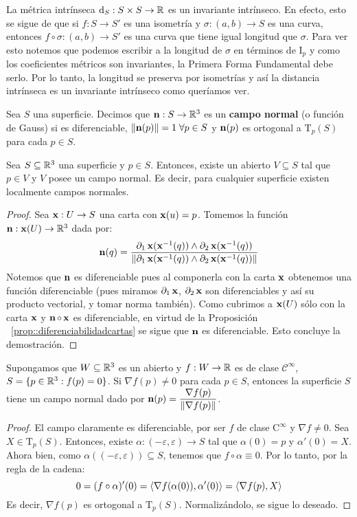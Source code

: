 \begin{obs}
La métrica intrínseca $\mathop{}\!\mathrm{d}_S:S\times S\to\mathbb{R}$ es un invariante intrínseco. En efecto, esto se sigue de que si $f:S\to S'$ es una isometría y $\sigma:(a,b)\to S$ es una curva, entonces $f\circ\sigma:(a,b)\to S'$ es una curva que tiene igual longitud que $\sigma$. Para ver esto notemos que podemos escribir a la longitud de $\sigma$ en términos de $\mathrm{I}_p$ y como los coeficientes métricos son invariantes, la Primera Forma Fundamental debe serlo. Por lo tanto, la longitud se preserva por isometrías y así la distancia intrínseca es un invariante intrínseco como queríamos ver.
\end{obs}

\begin{defn}
Sea $S$ una superficie. Decimos que $\operatorname{\mathbf{n}}:S\to\mathbb{R}^3$ es un \textbf{campo normal} (o función de Gauss) si es diferenciable, $\left\| \operatorname{\mathbf{n}}(p) \right\|=1\;\forall p\in S$ y $\operatorname{\mathbf{n}}(p)$ es ortogonal a $\mathrm{T}_p(S)$ para cada $p\in S$. 
\end{defn}

\begin{prop}
Sea $S\subseteq\mathbb{R}^3$ una superficie y $p\in S$. Entonces, existe un abierto $V\subseteq S$ tal que $p\in V$ y $V$ posee un campo normal. Es decir, para cualquier superficie existen localmente campos normales.
\begin{proof}
Sea $\operatorname{\mathbf{x}}:U\to S$ una carta con $\operatorname{\mathbf{x}}(u)=p$. Tomemos la función $\operatorname{\mathbf{n}}:\operatorname{\mathbf{x}}(U)\to\mathbb{R}^3$ dada por: $$\operatorname{\mathbf{n}}(q)=\dfrac{\partial_1\operatorname{\mathbf{x}}(\operatorname{\mathbf{x}}^{-1}(q))\wedge\partial_2\operatorname{\mathbf{x}}(\operatorname{\mathbf{x}}^{-1}(q))}{\left\| \partial_1\operatorname{\mathbf{x}}(\operatorname{\mathbf{x}}^{-1}(q))\wedge\partial_2\operatorname{\mathbf{x}}(\operatorname{\mathbf{x}}^{-1}(q)) \right\|}$$ Notemos que $\operatorname{\mathbf{n}}$ es diferenciable pues al componerla con la carta $\operatorname{\mathbf{x}}$ obtenemos una función diferenciable (pues miramos $\partial_1\operatorname{\mathbf{x}}$, $\partial_2\operatorname{\mathbf{x}}$ son diferenciables y así su producto vectorial, y tomar norma también). Como cubrimos a $\operatorname{\mathbf{x}}(U)$ sólo con la carta $\operatorname{\mathbf{x}}$ y $\operatorname{\mathbf{n}}\circ\operatorname{\mathbf{x}}$ es diferenciable, en virtud de la Proposición ~\ref{prop::diferenciabilidadcartas} se sigue que $\operatorname{\mathbf{n}}$ es diferenciable. Esto concluye la demostración.
\end{proof}
\end{prop}

\begin{prop}
Supongamos que $W\subseteq\mathbb{R}^3$ es un abierto y $f:W\to\mathbb{R}$ es de clase $\mathscr{C}^\infty$, $S=\{p\in\mathbb{R}^3:f(p)=0\}$. Si $\nabla f(p)\neq 0$ para cada $p\in S$, entonces la superficie $S$ tiene un campo normal dado por $\operatorname{\mathbf{n}}(p)=\dfrac{\nabla f(p)}{\left\| \nabla f(p) \right\|}$.
\begin{proof}
El campo claramente es diferenciable, por ser $f$ de clase $\mathrm{C}^\infty$ y $\nabla f\neq 0$. Sea $X\in\mathrm{T}_p(S)$. Entonces, existe $\alpha:(-\varepsilon,\varepsilon)\to S$ tal que $\alpha(0)=p$ y $\alpha'(0)=X$. Ahora bien, como $\alpha((-\varepsilon,\varepsilon))\subseteq S$, tenemos que $f\circ\alpha\equiv 0$. Por lo tanto, por la regla de la cadena: $$0 = (f\circ\alpha)'(0)=\left\langle \nabla f(\alpha(0)),\alpha'(0) \right\rangle = \left\langle \nabla f(p),X \right\rangle$$ Es decir, $\nabla f(p)$ es ortogonal a $\mathrm{T}_p(S)$. Normalizándolo, se sigue lo deseado.
\end{proof}
\end{prop}

